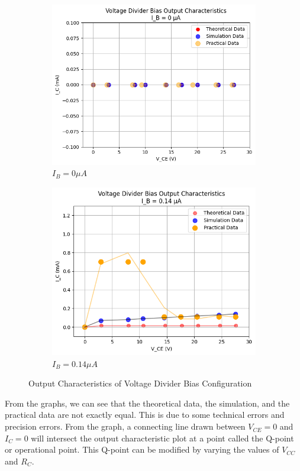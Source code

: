 \documentclass[12pt]{article}
\begin{document}
\begin{figure}[h!]
    \centering
    \begin{subfigure}{0.49\textwidth}
        \includegraphics[width=0.9\linewidth]{VD_0A.png}
        \caption{$I_B = 0\mu A$}
    \end{subfigure}
    \begin{subfigure}{0.49\textwidth}
        \includegraphics[width=0.9\linewidth]{VD_0.14A.png}
        \caption{$I_B = 0.14\mu A$}
    \end{subfigure}
    \caption{Output Characteristics of Voltage Divider Bias Configuration}
    \label{Voltage Divider Bias Graph}
\end{figure}

From the graphs, we can see that the theoretical data, the simulation, and the practical data are not exactly equal. This is due to some technical errors and precision errors. From the graph, a connecting line drawn between $V_{CE} = 0$ and $I_C = 0$ will intersect the output characteristic plot at a point called the Q-point or operational point. This Q-point can be modified by varying the values of $V_{CC}$ and $R_C$.
\end{document}
